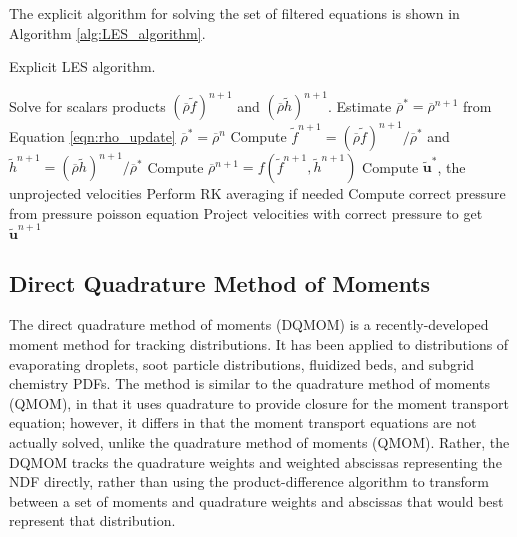 The explicit algorithm for solving the set of filtered equations is shown in Algorithm \ref{alg:LES_algorithm}.  
%
%
\begin{algorithm}[t]
\caption{Explicit LES algorithm.}\label{alg:LES_algorithm}
%
\begin{algorithmic}[] %
\STATE 	Solve for scalars products $(\overline{\rho} \widetilde{f})^{n+1}$ and $(\overline{\rho} \widetilde{h})^{n+1}$.
\STATE	Estimate $\overline{\rho}^* = \overline{\rho}^{n+1}$ from Equation \ref{eqn:rho_update}
\STATE $\overline{\rho}^* = \overline{\rho}^{n}$
\ENDIF
\STATE Compute $\widetilde{f}^{n+1} = (\overline{\rho}\widetilde{f})^{n+1}/{\overline{\rho}^*}$ and $\widetilde{h}^{n+1} = (\overline{\rho}\widetilde{h})^{n+1}/{\overline{\rho}^*}$ 
\STATE Compute $\overline{\rho}^{n+1} = f(\widetilde{f}^{n+1}, \widetilde{h}^{n+1})$
\STATE Compute $\widetilde{\mathbf{u}}^*$, the unprojected velocities
\STATE Perform RK averaging if needed
\STATE Compute correct pressure from pressure poisson equation
\STATE Project velocities with correct pressure to get $\widetilde{\mathbf{u}}^{n+1}$ 
\ENDFOR
\ENDFOR
\end{algorithmic}
\end{algorithm}


\subsection{Direct Quadrature Method of Moments}\label{sec:DQMOM}

The direct quadrature method of moments (DQMOM) is a recently-developed moment method for tracking distributions.  It has been applied to distributions of evaporating droplets, soot particle distributions, fluidized beds, and subgrid chemistry PDFs. The method is similar to the quadrature method of moments (QMOM), in that it uses quadrature to provide closure for the moment transport equation; however, it differs in that the moment transport equations are not actually solved, unlike the quadrature method of moments (QMOM). Rather, the DQMOM tracks the quadrature weights and weighted abscissas representing the NDF directly, rather than using the product-difference algorithm to transform between a set of moments and quadrature weights and abscissas that would best represent that distribution.

